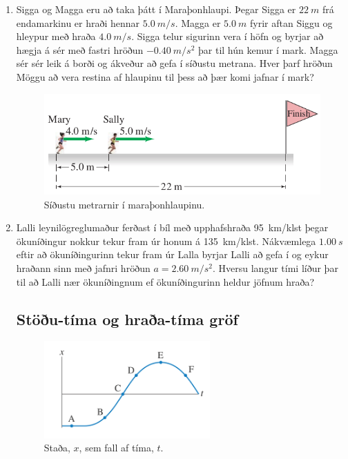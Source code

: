 \begin{enumerate}[label = \textbf{Dæmi \thechapter.\arabic*.}]
\item Sigga og Magga eru að taka þátt í Maraþonhlaupi. Þegar Sigga er $\SI{22}{m}$ frá endamarkinu er hraði hennar $\SI{5.0}{m/s}$. Magga er $\SI{5.0}{m}$ fyrir aftan Siggu og hleypur með hraða $\SI{4.0}{m/s}$. Sigga telur sigurinn vera í höfn og byrjar að hægja á sér með fastri hröðun $-\SI{0.40}{m/s^2}$ þar til hún kemur í mark. Magga sér sér leik á borði og ákveður að gefa í síðustu metrana. Hver þarf hröðun Möggu að vera restina af hlaupinu til þess að þær komi jafnar 
í mark?

\begin{figure}[H]
    \centering
    \includegraphics[scale = 0.35]{images/kapphlaup.png}
    \caption{Síðustu metrarnir í maraþonhlaupinu.}
    \label{fig:kapphlaup}
\end{figure}

\item Lalli leynilögreglumaður ferðast í bíl með upphafshraða \SI{95}{km/klst} þegar ökuníðingur nokkur tekur fram úr honum á \SI{135}{km/klst}. Nákvæmlega $\SI{1.00}{s}$ eftir að ökuníðingurinn tekur fram úr Lalla byrjar Lalli að gefa í og eykur hraðann sinn með jafnri hröðun $a = \SI{2.60}{m/s^2}$. Hversu langur tími líður þar til að Lalli nær ökuníðingnum ef ökuníðingurinn heldur jöfnum hraða? 

\subsection*{Stöðu-tíma og hraða-tíma gröf}

\begin{minipage}{\linewidth}

\begin{figure}
\vspace{-1cm}
\centering
\includegraphics[width=2.5in]{images/stada.png}
\caption{Staða, $x$, sem fall af tíma, $t$.}
\label{fig:stodutima}
\end{figure}


\end{minipage}
\end{enumerate}
